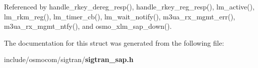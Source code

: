 Referenced by handle\+\_\+rkey\+\_\+dereg\+\_\+resp(), handle\+\_\+rkey\+\_\+reg\+\_\+resp(), lm\+\_\+active(), lm\+\_\+rkm\+\_\+reg(), lm\+\_\+timer\+\_\+cb(), lm\+\_\+wait\+\_\+notify(), m3ua\+\_\+rx\+\_\+mgmt\+\_\+err(), m3ua\+\_\+rx\+\_\+mgmt\+\_\+ntfy(), and osmo\+\_\+xlm\+\_\+sap\+\_\+down().



The documentation for this struct was generated from the following file\+:\begin{DoxyCompactItemize}
\item 
include/osmocom/sigtran/{\bf sigtran\+\_\+sap.\+h}\end{DoxyCompactItemize}
